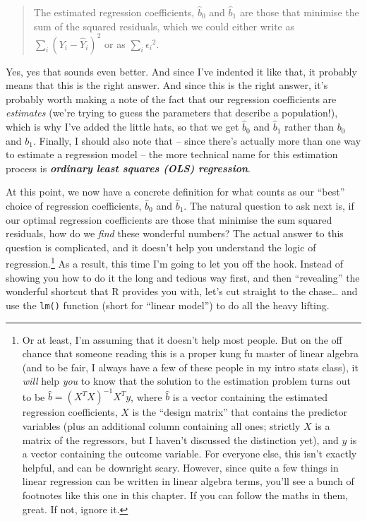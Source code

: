 \documentclass[
]{book}
\begin{document}
\begin{quote}
The estimated regression coefficients, \(\hat{b}_0\) and \(\hat{b}_1\) are those that minimise the sum of the squared residuals, which we could either write as \(\sum_i (Y_i - \hat{Y}_i)^2\) or as \(\sum_i {\epsilon_i}^2\).
\end{quote}

Yes, yes that sounds even better. And since I've indented it like that, it probably means that this is the right answer. And since this is the right answer, it's probably worth making a note of the fact that our regression coefficients are \emph{estimates} (we're trying to guess the parameters that describe a population!), which is why I've added the little hats, so that we get \(\hat{b}_0\) and \(\hat{b}_1\) rather than \(b_0\) and \(b_1\). Finally, I should also note that -- since there's actually more than one way to estimate a regression model -- the more technical name for this estimation process is \textbf{\emph{ordinary least squares (OLS) regression}}.

At this point, we now have a concrete definition for what counts as our ``best'' choice of regression coefficients, \(\hat{b}_0\) and \(\hat{b}_1\). The natural question to ask next is, if our optimal regression coefficients are those that minimise the sum squared residuals, how do we \emph{find} these wonderful numbers? The actual answer to this question is complicated, and it doesn't help you understand the logic of regression.\footnote{Or at least, I'm assuming that it doesn't help most people. But on the off chance that someone reading this is a proper kung fu master of linear algebra (and to be fair, I always have a few of these people in my intro stats class), it \emph{will} help \emph{you} to know that the solution to the estimation problem turns out to be \(\hat{b} = (X^TX)^{-1} X^T y\), where \(\hat{b}\) is a vector containing the estimated regression coefficients, \(X\) is the ``design matrix'' that contains the predictor variables (plus an additional column containing all ones; strictly \(X\) is a matrix of the regressors, but I haven't discussed the distinction yet), and \(y\) is a vector containing the outcome variable. For everyone else, this isn't exactly helpful, and can be downright scary. However, since quite a few things in linear regression can be written in linear algebra terms, you'll see a bunch of footnotes like this one in this chapter. If you can follow the maths in them, great. If not, ignore it.} As a result, this time I'm going to let you off the hook. Instead of showing you how to do it the long and tedious way first, and then ``revealing'' the wonderful shortcut that R provides you with, let's cut straight to the chase\ldots{} and use the \texttt{lm()} function (short for ``linear model'') to do all the heavy lifting.
\end{document}
